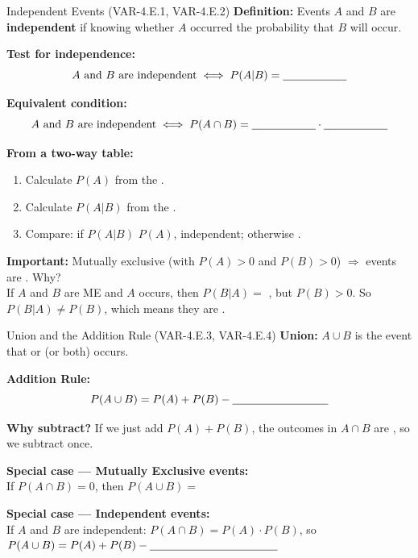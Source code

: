 \documentclass[10pt]{article}
\begin{document}
\begin{notesbox}{Independent Events (VAR-4.E.1, VAR-4.E.2)}
\small
\textbf{Definition:} Events $A$ and $B$ are \textbf{independent} if knowing whether
$A$ occurred \blank{5cm} the probability that $B$ will occur.

\vspace{8pt}
\textbf{Test for independence:}
\[
  A \text{ and } B \text{ are independent} \iff P(A|B) = \blank{2cm}
\]

\vspace{4pt}
\textbf{Equivalent condition:}
\[
  A \text{ and } B \text{ are independent} \iff P(A \cap B) = \blank{2cm} \cdot \blank{2cm}
\]

\vspace{8pt}
\textbf{From a two-way table:}
\begin{enumerate}[leftmargin=1.5em, itemsep=4pt]
  \item Calculate $P(A)$ from the \blank{4cm}.
  \item Calculate $P(A|B)$ from the \blank{4cm}.
  \item Compare: if $P(A|B)$ \blank{3cm} $P(A)$, independent; otherwise \blank{3cm}.
\end{enumerate}

\vspace{8pt}
\textbf{Important:} Mutually exclusive (with $P(A) > 0$ and $P(B) > 0$) $\Rightarrow$
events are \blank{5cm}. Why?\\[4pt]
If $A$ and $B$ are ME and $A$ occurs, then $P(B|A) = $ \blank{2cm}, but $P(B) > 0$.
So $P(B|A) \neq P(B)$, which means they are \blank{3cm}.
\end{notesbox}

\vspace{0.1in}

\begin{notesbox}{Union and the Addition Rule (VAR-4.E.3, VAR-4.E.4)}
\small
\textbf{Union:} $A \cup B$ is the event that \blank{2cm} or \blank{2cm} (or both) occurs.

\vspace{8pt}
\textbf{Addition Rule:}
\[
  P(A \cup B) = P(A) + P(B) - \blank{3cm}
\]

\vspace{4pt}
\textbf{Why subtract?} If we just add $P(A) + P(B)$, the outcomes in $A \cap B$ are
\blank{4cm}, so we subtract once.

\vspace{8pt}
\textbf{Special case --- Mutually Exclusive events:}\\
If $P(A \cap B) = 0$, then $P(A \cup B) = $ \blank{4cm}

\vspace{8pt}
\textbf{Special case --- Independent events:}\\
If $A$ and $B$ are independent: $P(A \cap B) = P(A) \cdot P(B)$, so
$P(A \cup B) = P(A) + P(B) - \blank{4cm}$
\end{notesbox}
\end{document}
